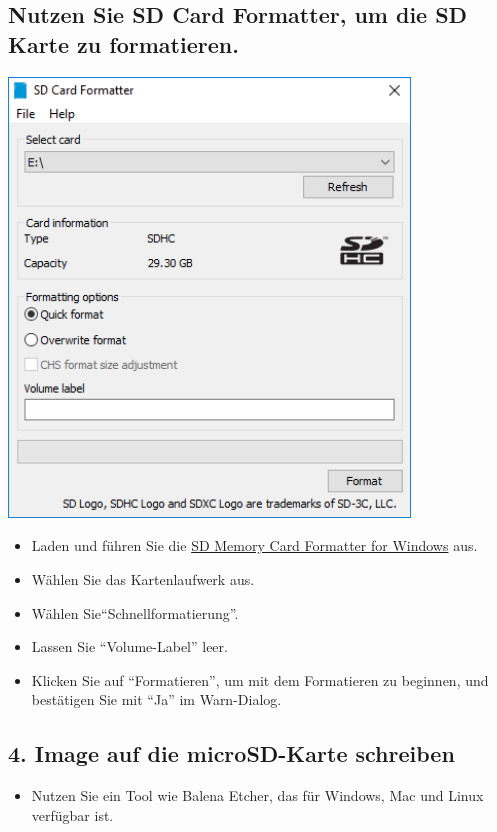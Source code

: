 \documentclass{article}
\begin{document}
\subsection{Nutzen Sie SD Card Formatter, um die SD Karte zu formatieren.}
\begin{center}
    \includegraphics[width=0.8\textwidth ]{SD_Card_Formatter.png}
\end{center}

\begin{itemize}
    \item Laden und führen Sie die \textcolor{blue}{\href{https://www.sdcard.org/downloads/formatter/sd-memory-card-formatter-for-windows-download/}{SD Memory Card Formatter for Windows}} aus.
    \item Wählen Sie das Kartenlaufwerk aus.
    \item Wählen Sie``Schnellformatierung''.
    \item Lassen Sie ``Volume-Label'' leer.
    \item Klicken Sie auf ``Formatieren'', um mit dem Formatieren zu beginnen, und bestätigen Sie mit ``Ja'' im Warn-Dialog.
\end{itemize}
\subsection{4. Image auf die microSD-Karte schreiben}
\begin{itemize}
    \item Nutzen Sie ein Tool wie Balena Etcher, das für Windows, Mac und Linux verfügbar ist.
\end{itemize}
\end{document}
